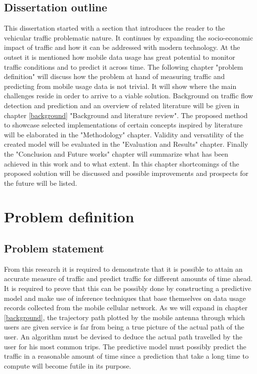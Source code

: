 \documentclass[12pt, a4paper]{report}
\theoremstyle{definition}
\theoremstyle{definition}%
\theoremstyle{definition}%
\theoremstyle{definition}%
\theoremstyle{definition}%
\theoremstyle{definition}%
\begin{document}
\section{Dissertation outline}
This dissertation started with a section that introduces the reader to the vehicular traffic problematic nature. It continues by expanding the socio-economic impact of traffic and how it can be addressed with modern technology. At the outset it is mentioned how mobile data usage has great potential to monitor traffic conditions and to predict it across time. The following chapter "problem definition" will discuss how the problem at hand of measuring traffic and predicting from mobile usage data is not trivial. It will show where the main challenges reside in order to arrive to a viable solution. Background on traffic flow detection and prediction and an overview of related literature will be given in chapter \ref{background} "Background and literature review". The proposed method to showcase selected implementations of certain concepts inspired by literature will be elaborated in the "Methodology" chapter.  Validity and versatility of the created model will be evaluated in the "Evaluation and Results" chapter. Finally the "Conclusion and Future works" chapter will summarize what has been achieved in this work and to what extent.  In this chapter shortcomings of the proposed solution will be discussed and possible improvements and prospects for the future will be listed.



\chapter{Problem definition}

\section{Problem statement}
From this research it is required to demonstrate that it is possible to attain an accurate measure of traffic and predict traffic for different amounts of time ahead. It is required to prove that this can be possibly done by constructing a predictive model and make use of inference techniques that base themselves on data usage records collected from the mobile cellular network. As we will expand in chapter \ref{background}, the trajectory path plotted by the mobile antenna through which users are given service is far from being a true picture of the actual path of the user.  An algorithm must be devised to deduce the actual path travelled by the user for his most common trips. The predictive model must possibly predict the traffic in a reasonable amount of time since a prediction that take a long time to compute will become futile in its purpose.
\end{document}
